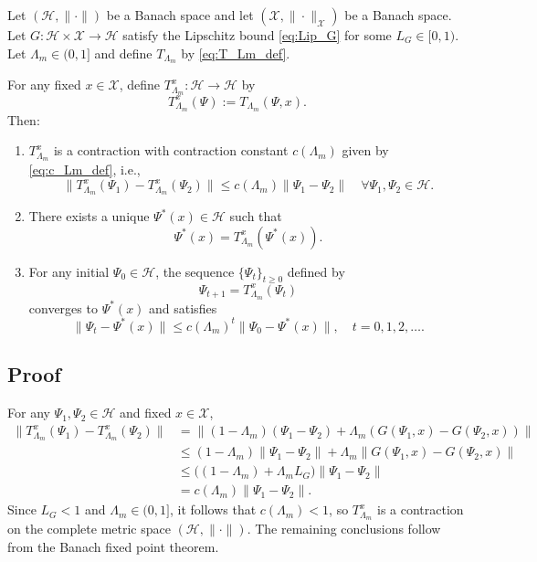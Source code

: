 \documentclass[11pt]{article}
\begin{document}
\begin{theorem}
Let $(\mathcal{H},\|\cdot\|)$ be a Banach space and let $(\mathcal{X},\|\cdot\|_{\mathcal{X}})$ be a Banach space. Let $G : \mathcal{H} \times \mathcal{X} \to \mathcal{H}$ satisfy the Lipschitz bound \eqref{eq:Lip_G} for some $L_G \in [0,1)$. Let $\Lambda_m \in (0,1]$ and define $T_{\Lambda_m}$ by \eqref{eq:T_Lm_def}.

For any fixed $x \in \mathcal{X}$, define $T_{\Lambda_m}^x : \mathcal{H} \to \mathcal{H}$ by
\begin{equation}
  T_{\Lambda_m}^x(\Psi) := T_{\Lambda_m}(\Psi,x).
\end{equation}
Then:
\begin{enumerate}
  \item $T_{\Lambda_m}^x$ is a contraction with contraction constant $c(\Lambda_m)$ given by \eqref{eq:c_Lm_def}, i.e.,
  \[
    \|T_{\Lambda_m}^x(\Psi_1) - T_{\Lambda_m}^x(\Psi_2)\|
    \leq
    c(\Lambda_m) \|\Psi_1 - \Psi_2\|
    \quad \forall \Psi_1,\Psi_2 \in \mathcal{H}.
  \]
  \item There exists a unique $\Psi^\ast(x) \in \mathcal{H}$ such that
  \[
    \Psi^\ast(x) = T_{\Lambda_m}^x(\Psi^\ast(x)).
  \]
  \item For any initial $\Psi_0 \in \mathcal{H}$, the sequence $\{\Psi_t\}_{t \geq 0}$ defined by
  \[
    \Psi_{t+1} = T_{\Lambda_m}^x(\Psi_t)
  \]
  converges to $\Psi^\ast(x)$ and satisfies
  \[
    \|\Psi_t - \Psi^\ast(x)\|
    \leq
    c(\Lambda_m)^t \|\Psi_0 - \Psi^\ast(x)\|,
    \quad t = 0,1,2,\dots.
  \]
\end{enumerate}
\end{theorem}

\subsection{Proof}

For any $\Psi_1,\Psi_2 \in \mathcal{H}$ and fixed $x \in \mathcal{X}$,
\begin{align*}
  \|T_{\Lambda_m}^x(\Psi_1) - T_{\Lambda_m}^x(\Psi_2)\|
  &=
  \|(1 - \Lambda_m)(\Psi_1 - \Psi_2)
    + \Lambda_m (G(\Psi_1,x) - G(\Psi_2,x))\| \\
  &\leq
  (1 - \Lambda_m) \|\Psi_1 - \Psi_2\|
  + \Lambda_m \|G(\Psi_1,x) - G(\Psi_2,x)\| \\
  &\leq
  \bigl( (1 - \Lambda_m) + \Lambda_m L_G \bigr)
  \|\Psi_1 - \Psi_2\| \\
  &=
  c(\Lambda_m) \|\Psi_1 - \Psi_2\|.
\end{align*}
Since $L_G < 1$ and $\Lambda_m \in (0,1]$, it follows that $c(\Lambda_m) < 1$, so $T_{\Lambda_m}^x$ is a contraction on the complete metric space $(\mathcal{H},\|\cdot\|)$. The remaining conclusions follow from the Banach fixed point theorem.
\end{document}
